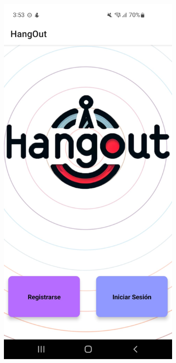\clearpage
\vspace*{\fill}
\begin{figure}[H]
    \centering
    \begin{subfigure}{0.45\textwidth}
        \centering
        \includegraphics[width=\linewidth]{imagenes/Capturas/Inicio.jpeg}

\end{subfigure}
\end{figure}
